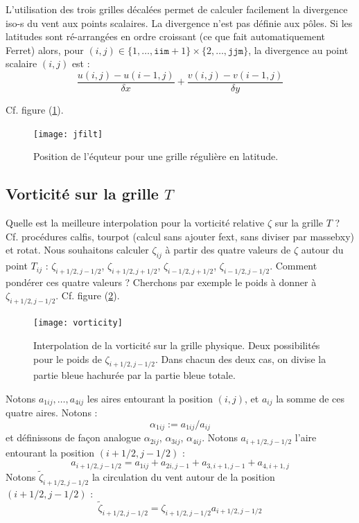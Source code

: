 \documentclass[a4paper,english,french]{article}
\begin{document}
L'utilisation des trois grilles décalées permet de calculer facilement
la divergence iso-s du vent aux points scalaires. La divergence n'est
pas définie aux pôles. Si les latitudes sont ré-arrangées en ordre
croissant (ce que fait automatiquement Ferret) alors, pour $(i, j) \in
\{1, \dots, \mathtt{iim} + 1\} \times \{2, \dots, \mathtt{jjm}\}$, la
divergence au point scalaire $(i, j)$ est :
\begin{equation*}
  \frac{u(i, j) - u(i-1, j)}{\delta x} + \frac{v(i, j) - v(i-1, j)}{\delta y}
\end{equation*}

Cf. figure (\ref{fig:jfilt}).
\begin{figure}
  \centering
  \texttt{[image: jfilt]}
  \caption{Position de l'équteur pour une grille régulière en
    latitude.}
  \label{fig:jfilt}
\end{figure}

\subsection{Vorticité sur la grille $T$}

Quelle est la meilleure interpolation pour la vorticité relative
$\zeta$ sur la grille $T$ ? Cf. procédures calfis, tourpot (calcul
sans ajouter fext, sans diviser par massebxy) et rotat. Nous
souhaitons calculer $\zeta_{ij}$ à partir des quatre valeurs de
$\zeta$ autour du point $T_{ij}$ : $\zeta_{i+1/2,j-1/2}$,
$\zeta_{i+1/2,j+1/2}$, $\zeta_{i-1/2,j+1/2}$,
$\zeta_{i-1/2,j-1/2}$. Comment pondérer ces quatre valeurs ? Cherchons
par exemple le poids à donner à $\zeta_{i+1/2,j-1/2}$. Cf. figure
(\ref{fig:vorticity}).
\begin{figure}
  \centering
  \texttt{[image: vorticity]}
  \caption[Interpolation de la vorticité sur la grille
  physique]{Interpolation de la vorticité sur la grille physique. Deux
    possibilités pour le poids de $\zeta_{i+1/2,j-1/2}$. Dans chacun
    des deux cas, on divise la partie bleue hachurée par la partie
    bleue totale.}
  \label{fig:vorticity}
\end{figure}
Notons $a_{1ij}, \dots, a_{4ij}$ les aires entourant la position
$(i, j)$, et $a_{ij}$ la somme de ces quatre aires. Notons :
\begin{equation*}
  \alpha_{1ij} := a_{1ij} / a_{ij}
\end{equation*}
et définissons de façon analogue $\alpha_{2ij}$, $\alpha_{3ij}$,
$\alpha_{4ij}$. Notons $a_{i+1/2, j-1/2}$ l'aire entourant la position
$(i+1/2, j-1/2)$ :
\begin{equation*}
  a_{i+1/2, j-1/2} = a_{1ij} + a_{2i,j-1} + a_{3,i+1,j-1} + a_{4,i+1,j}
\end{equation*}
Notons $\tilde \zeta_{i+1/2, j-1/2}$ la circulation du vent autour de
la position $(i+1/2, j-1/2)$ :
\begin{equation*}
  \tilde \zeta_{i+1/2, j-1/2} = \zeta_{i+1/2, j-1/2} a_{i+1/2, j-1/2}
\end{equation*}
\end{document}
